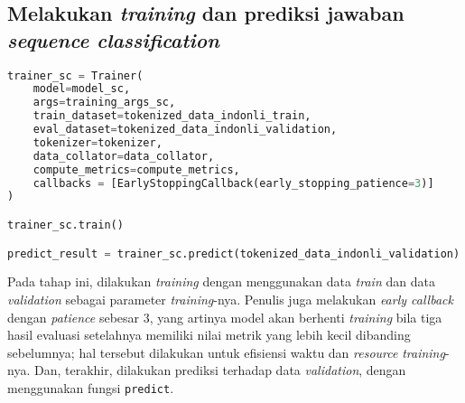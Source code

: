 \subsection{Melakukan \emph{training} dan prediksi jawaban \emph{sequence classification}}
\begin{lstlisting}[language=Python, caption=Melakukan \emph{training} dan prediksi jawaban \emph{sequence classification}]
trainer_sc = Trainer(
    model=model_sc,
    args=training_args_sc,
    train_dataset=tokenized_data_indonli_train,
    eval_dataset=tokenized_data_indonli_validation,
    tokenizer=tokenizer,
    data_collator=data_collator,
    compute_metrics=compute_metrics,
    callbacks = [EarlyStoppingCallback(early_stopping_patience=3)]
)

trainer_sc.train()

predict_result = trainer_sc.predict(tokenized_data_indonli_validation)
\end{lstlisting}

Pada tahap ini, dilakukan \emph{training} dengan menggunakan data \emph{train} dan data \emph{validation} sebagai parameter \emph{training}-nya. Penulis juga melakukan \emph{early callback} dengan \emph{patience} sebesar 3, yang artinya model akan berhenti \emph{training} bila tiga hasil evaluasi setelahnya memiliki nilai metrik yang lebih kecil dibanding sebelumnya; hal tersebut dilakukan untuk efisiensi waktu dan \emph{resource} \emph{training}-nya. Dan, terakhir, dilakukan prediksi terhadap data \emph{validation}, dengan menggunakan fungsi \texttt{predict}.

